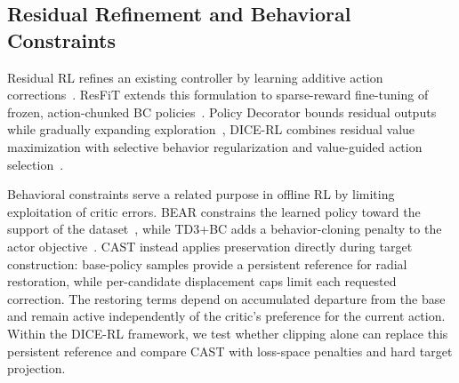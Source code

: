 \subsection{Residual Refinement and Behavioral Constraints}

Residual RL refines an existing controller by learning additive action corrections~\cite{johannink2019residual}. ResFiT extends this formulation to sparse-reward fine-tuning of frozen, action-chunked BC policies~\cite{ankile2025resfit}. Policy Decorator bounds residual outputs while gradually expanding exploration~\cite{yuan2025policydecorator}, DICE-RL combines residual value maximization with selective behavior regularization and value-guided action selection~\cite{dicerl2026}.

Behavioral constraints serve a related purpose in offline RL by limiting exploitation of critic errors. BEAR constrains the learned policy toward the support of the dataset~\cite{kumar2019bear}, while TD3+BC adds a behavior-cloning penalty to the actor objective~\cite{fujimoto2021td3bc}. CAST instead applies preservation directly during target construction: base-policy samples provide a persistent reference for radial restoration, while per-candidate displacement caps limit each requested correction. The restoring terms depend on accumulated departure from the base and remain active independently of the critic's preference for the current action. Within the DICE-RL framework, we test whether clipping alone can replace this persistent reference and compare CAST with loss-space penalties and hard target projection.

